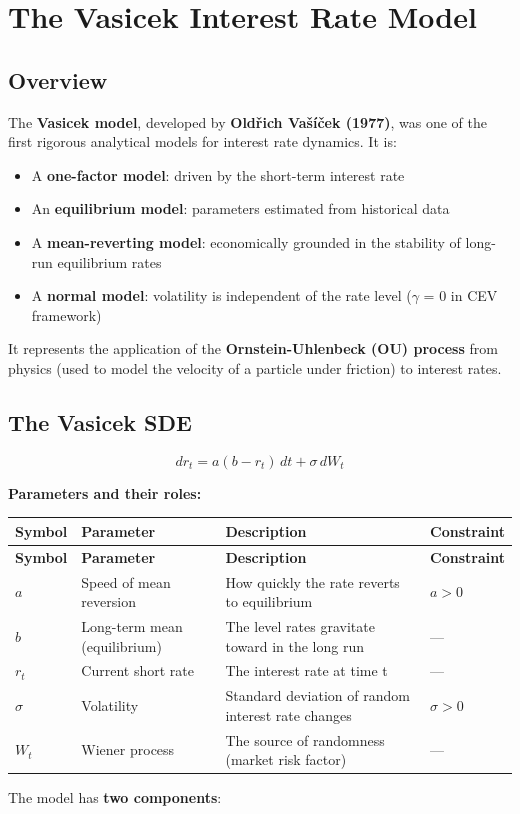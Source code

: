 \documentclass[12pt,openany]{book}
\theoremstyle{definition}
\theoremstyle{remark}
\begin{document}
\section{The Vasicek Interest Rate Model}
\subsection{Overview}
The \textbf{Vasicek model}, developed by \textbf{Oldřich Vašíček (1977)}, was one of the first rigorous analytical models for interest rate dynamics. It is:

\begin{itemize}
\item A \textbf{one-factor model}: driven by the short-term interest rate


\item An \textbf{equilibrium model}: parameters estimated from historical data


\item A \textbf{mean-reverting model}: economically grounded in the stability of long-run equilibrium rates


\item A \textbf{normal model}: volatility is independent of the rate level (\(\gamma\) = 0 in CEV framework)


\end{itemize}
It represents the application of the \textbf{Ornstein-Uhlenbeck (OU) process} from physics (used to model the velocity of a particle under friction) to interest rates.

\medskip
\subsection{The Vasicek SDE}
\[
\boxed{dr_t = a(b - r_t) \, dt + \sigma \, dW_t}
\]

\textbf{Parameters and their roles:}

\begingroup
\footnotesize
\begin{longtable}{@{}L{0.15\textwidth}L{0.25\textwidth}L{0.25\textwidth}L{0.25\textwidth}@{}}
\toprule
\textbf{Symbol} & \textbf{Parameter} & \textbf{Description} & \textbf{Constraint} \\
\midrule
\endfirsthead
\toprule
\textbf{Symbol} & \textbf{Parameter} & \textbf{Description} & \textbf{Constraint} \\
\midrule
\endhead
$a$ & Speed of mean reversion & How quickly the rate reverts to equilibrium & $a > 0$ \\
$b$ & Long-term mean (equilibrium) & The level rates gravitate toward in the long run & --- \\
$r_t$ & Current short rate & The interest rate at time t & --- \\
$\sigma$ & Volatility & Standard deviation of random interest rate changes & $\sigma > 0$ \\
$W_t$ & Wiener process & The source of randomness (market risk factor) & --- \\
\bottomrule
\end{longtable}
\endgroup
The model has \textbf{two components}:
\end{document}
